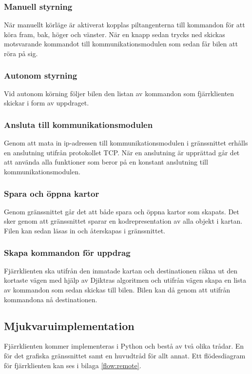 \documentclass[tekniskrapport/tech.tex]{subfiles}
\begin{document}
\subsubsection{Manuell styrning}
När manuellt körläge är aktiverat kopplas piltangenterna till kommandon för att köra
fram, bak, höger och vänster. När en knapp sedan trycks ned skickas motsvarande
kommandot till kommunikationsmodulen som sedan får bilen att röra på sig.

\subsubsection{Autonom styrning}
Vid autonom körning följer bilen den listan av kommandon som fjärrklienten
skickar i form av uppdraget.

\subsubsection{Ansluta till kommunikationsmodulen}
Genom att mata in ip-adressen till kommunikationsmodulen i gränssnittet erhålls
en anslutning utifrån protokollet TCP. När en anslutning är upprättad går det
att använda alla funktioner som beror på en konstant anslutning till
kommunikationsmodulen.

\subsubsection{Spara och öppna kartor}
Genom gränssnittet går det att både spara och öppna kartor som skapats. Det
sker genom att gränssnittet sparar en kodrepresentation av alla objekt i
kartan. Filen kan sedan läsas in och återskapas i gränssnittet.

\subsubsection{Skapa kommandon för uppdrag}
Fjärrklienten ska utifrån den inmatade kartan och destinationen räkna ut den
kortaste vägen med hjälp av Djiktras algoritmen och utifrån vägen skapa en
lista av kommandon som sedan skickas till bilen. Bilen kan då genom att utifrån
kommandona nå destinationen.

\subsection{Mjukvaruimplementation}
Fjärrklienten kommer implementeras i Python och bestå av två olika trådar. En
för det grafiska gränssnittet samt en huvudtråd för allt annat. Ett
flödesdiagram för fjärrklienten kan ses i bilaga \ref{flow:remote}.
\end{document}
